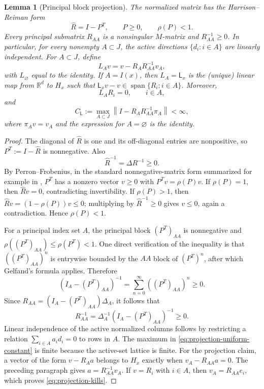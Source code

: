 \documentclass[aihp]{imsart}
\numberwithin{equation}{section}
\theoremstyle{plain}
\newtheorem{lemma}[lemma]{Lemma}
\theoremstyle{definition}
\newcommand{\1}{\mathbf 1}
\begin{document}
\begin{lemma}[Principal block projection]\label{lem:Mmatrix}\label{lem:projection}
The normalized matrix has the Harrison--Reiman form
\begin{equation}\label{eq:HR-form}
 \widehat R=I-P^T,
 \qquad P\ge0,
 \qquad \rho(P)<1.
\end{equation}
Every principal submatrix $R_{AA}$ is a nonsingular $M$-matrix and $R_{AA}^{-1}\ge0$. In particular, for every nonempty $A\subset J$, the active directions $\{d_i:i\in A\}$ are linearly independent. For $A\subset J$, define
\begin{equation}\label{eq:projection-formula}
 L_Av=v-R_A R_{AA}^{-1}v_A,
\end{equation}
with $L_\varnothing$ equal to the identity. If $A=I(x)$, then $L_A=\mathsf L_x$ is the (unique) linear map from $\mathbb R^d$ to $H_x$ such that $\mathsf L_xv-v\in\operatorname{span}\{R_i:i\in A\}$. Moreover,
\begin{equation}\label{eq:projection-kills}
 L_A R_i=0,
 \qquad i\in A,
\end{equation}
and
\begin{equation}\label{eq:projection-uniform-constant}
 C_{\mathsf L}:=\max_{A\subset J}\left\|I-R_A R_{AA}^{-1}\pi_A\right\|<\infty,
\end{equation}
where $\pi_Av=v_A$ and the expression for $A=\varnothing$ is the identity.
\end{lemma}

\begin{proof}
The diagonal of $\widehat R$ is one and its off-diagonal entries are nonpositive, so $P^T:=I-\widehat R$ is nonnegative. Also
\[
 \widehat R^{-1}=\Delta R^{-1}\ge0.
\]
By Perron--Frobenius, in the standard nonnegative-matrix form summarized for example in \cite[Chapter~2]{BermanPlemmons1994}, $P^T$ has a nonzero vector $v\ge0$ with $P^Tv=\rho(P)v$. If $\rho(P)=1$, then $\widehat Rv=0$, contradicting invertibility. If $\rho(P)>1$, then $\widehat Rv=(1-\rho(P))v\le0$; multiplying by $\widehat R^{-1}\ge0$ gives $v\le0$, again a contradiction. Hence $\rho(P)<1$.

For a principal index set $A$, the principal block $(P^T)_{AA}$ is nonnegative and $\rho((P^T)_{AA})\le\rho(P^T)<1$. One direct verification of the inequality is that $((P^T)_{AA})^n$ is entrywise bounded by the $AA$ block of $(P^T)^n$, after which Gelfand's formula applies. Therefore
\[
 (I_A-(P^T)_{AA})^{-1}=\sum_{n=0}^\infty ((P^T)_{AA})^n\ge0.
\]
Since $R_{AA}=(I_A-(P^T)_{AA})\Delta_A$, it follows that
\[
 R_{AA}^{-1}=\Delta_A^{-1}(I_A-(P^T)_{AA})^{-1}\ge0.
\]
Linear independence of the active normalized columns follows by restricting a relation $\sum_{i\in A}a_i d_i=0$ to rows in $A$. The maximum in \eqref{eq:projection-uniform-constant} is finite because the active-set lattice is finite.
For the projection claim, a vector of the form $v-R_Aa$ belongs to $H_x$ exactly when $v_A-R_{AA}a=0$. The preceding paragraph gives $a=R_{AA}^{-1}v_A$. If $v=R_i$ with $i\in A$, then $v_A=R_{AA}e_i$, which proves \eqref{eq:projection-kills}.
\end{proof}
\end{document}
